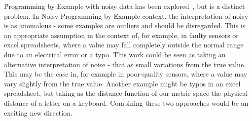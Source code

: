 Programming by Example with noisy data has been explored~\cite{raychev2016learning}, but is a distinct problem.
In Noisy Programming by Example context, the interpretation of noisy is as anomalous - some examples are outliers and should be disregarded.
This is an appropriate assumption in the context of, for example, in faulty sensors or excel spreadsheets, where a value may fall completely outside the normal range due to an electrical error or a typo.
This work could be seen as taking an alternative interpretation of noise - that as small variations from the true value.
This may be the case in, for example in poor-quality sensors, where a value may vary slightly from the true value.
Another example might be typos in an excel spreadsheet, but taking as the distance function of our metric space the physical distance of a letter on a keyboard.
Combining these two approaches would be an exciting new direction.

